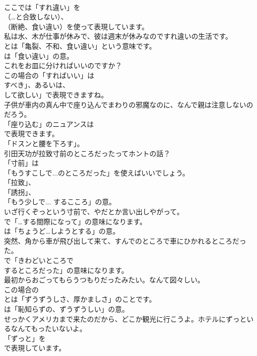 \documentclass[8pt]{extreport}
\begin{document}
\begin{CJK}{UTF8}{min}
\\	ここでは「すれ違い」を 
\\	（…と合致しない）、
\\	（断絶、食い違い）を使って表現しています。	
\\	私は水、木が仕事が休みで、彼は週末が休みなのですれ違いの生活です。 
\\	とは「亀裂、不和、食い違い」という意味です。
\\	は「食い違い」の意。	
\\	これをお皿に分ければいいのですか？ 
\\	この場合の「すればいい」は
\\	すべき」、あるいは、
\\	して欲しい」で表現できますね。	
\\	子供が車内の真ん中で座り込んでまわりの邪魔なのに、なんで親は注意しないのだろう。 
\\	「座り込む」のニュアンスは
\\	で表現できます。
\\	「ドスンと腰を下ろす」。	
\\	引田天功が拉致寸前のところだったってホントの話？ 
\\	「寸前」は
\\	「もうすこしで...のところだった」を使えばいいでしょう。
\\	「拉致」、
\\	「誘拐」、
\\	「もう少しで... するこころ」の意。	
\\	いざ行くぞっという寸前で、やだとか言い出しやがって。 
\\	で「…する間際になって」の意味になります。
\\	は「ちょうど…しようとする」の意。	
\\	突然、角から車が飛び出して来て、すんでのところで車にひかれるところだった。 
\\	で「きわどいところで 
\\	するところだった」の意味になります。	
\\	最初からおごってもらうつもりだったみたい。なんて図々しい。 
\\	この場合の 
\\	とは「ずうずうしさ、厚かましさ」のことです。
\\	は「恥知らずの、ずうずうしい」の意。	
\\	せっかくアメリカまで来たのだから、どこか観光に行こうよ。ホテルにずっといるなんてもったいないよ。 
\\	「ずっと」を
\\	で表現しています。

\end{CJK}
\end{document}

